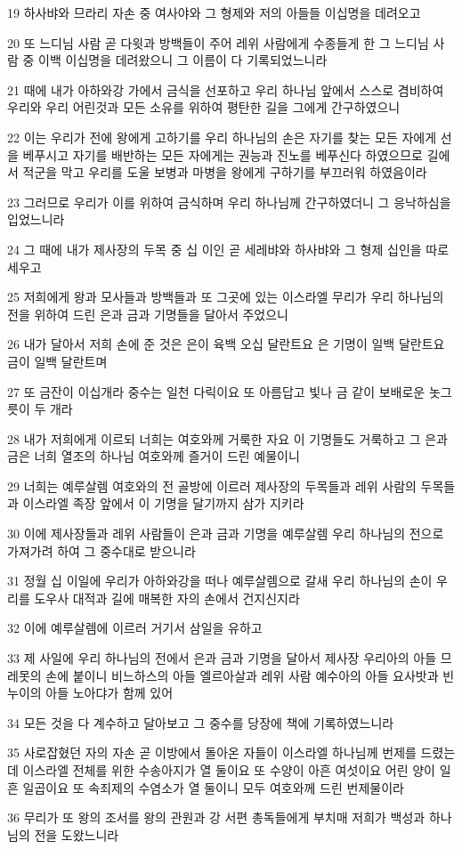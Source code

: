 \par 19 하사뱌와 므라리 자손 중 여사야와 그 형제와 저의 아들들 이십명을 데려오고
\par 20 또 느디님 사람 곧 다윗과 방백들이 주어 레위 사람에게 수종들게 한 그 느디님 사람 중 이백 이십명을 데려왔으니 그 이름이 다 기록되었느니라
\par 21 때에 내가 아하와강 가에서 금식을 선포하고 우리 하나님 앞에서 스스로 겸비하여 우리와 우리 어린것과 모든 소유를 위하여 평탄한 길을 그에게 간구하였으니
\par 22 이는 우리가 전에 왕에게 고하기를 우리 하나님의 손은 자기를 찾는 모든 자에게 선을 베푸시고 자기를 배반하는 모든 자에게는 권능과 진노를 베푸신다 하였으므로 길에서 적군을 막고 우리를 도울 보병과 마병을 왕에게 구하기를 부끄러워 하였음이라
\par 23 그러므로 우리가 이를 위하여 금식하며 우리 하나님께 간구하였더니 그 응낙하심을 입었느니라
\par 24 그 때에 내가 제사장의 두목 중 십 이인 곧 세레뱌와 하사뱌와 그 형제 십인을 따로 세우고
\par 25 저희에게 왕과 모사들과 방백들과 또 그곳에 있는 이스라엘 무리가 우리 하나님의 전을 위하여 드린 은과 금과 기명들을 달아서 주었으니
\par 26 내가 달아서 저희 손에 준 것은 은이 육백 오십 달란트요 은 기명이 일백 달란트요 금이 일백 달란트며
\par 27 또 금잔이 이십개라 중수는 일천 다릭이요 또 아름답고 빛나 금 같이 보배로운 놋그릇이 두 개라
\par 28 내가 저희에게 이르되 너희는 여호와께 거룩한 자요 이 기명들도 거룩하고 그 은과 금은 너희 열조의 하나님 여호와께 즐거이 드린 예물이니
\par 29 너희는 예루살렘 여호와의 전 골방에 이르러 제사장의 두목들과 레위 사람의 두목들과 이스라엘 족장 앞에서 이 기명을 달기까지 삼가 지키라
\par 30 이에 제사장들과 레위 사람들이 은과 금과 기명을 예루살렘 우리 하나님의 전으로 가져가려 하여 그 중수대로 받으니라
\par 31 정월 십 이일에 우리가 아하와강을 떠나 예루살렘으로 갈새 우리 하나님의 손이 우리를 도우사 대적과 길에 매복한 자의 손에서 건지신지라
\par 32 이에 예루살렘에 이르러 거기서 삼일을 유하고
\par 33 제 사일에 우리 하나님의 전에서 은과 금과 기명을 달아서 제사장 우리아의 아들 므레못의 손에 붙이니 비느하스의 아들 엘르아살과 레위 사람 예수아의 아들 요사밧과 빈누이의 아들 노아댜가 함께 있어
\par 34 모든 것을 다 계수하고 달아보고 그 중수를 당장에 책에 기록하였느니라
\par 35 사로잡혔던 자의 자손 곧 이방에서 돌아온 자들이 이스라엘 하나님께 번제를 드렸는데 이스라엘 전체를 위한 수송아지가 열 둘이요 또 수양이 아흔 여섯이요 어린 양이 일흔 일곱이요 또 속죄제의 수염소가 열 둘이니 모두 여호와께 드린 번제물이라
\par 36 무리가 또 왕의 조서를 왕의 관원과 강 서편 총독들에게 부치매 저희가 백성과 하나님의 전을 도왔느니라

